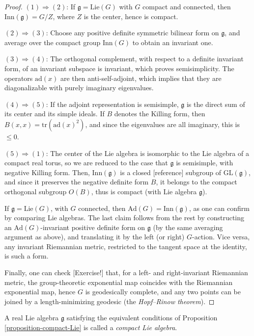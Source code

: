 \begin{proof}
 $(1) \Rightarrow (2)$: If $\mathfrak g = \text{Lie}(G)$ with $G$ compact and connected, then $\text{Inn}(\mathfrak g) = G/Z$, where $Z$ is the center, hence is compact. 
 
 $(2) \Rightarrow (3)$: Choose any positive definite symmetric bilinear form on $\mathfrak g$, and average over the compact group $\text{Inn}(G)$ to obtain an invariant one.
 
 $(3) \Rightarrow (4)$: The orthogonal complement, with respect to a definite invariant form, of an invariant subspace is invariant, which proves semisimplicity. The operators $\text{ad}(x)$ are then anti-self-adjoint, which implies that they are diagonalizable with purely imaginary eigenvalues.
 
 $(4) \Rightarrow (5)$: If the adjoint representation is semisimple, $\mathfrak g$ is the direct sum of its center and its simple ideals. If $B$ denotes the Killing form, then $B(x,x) = \text{tr}(\text{ad}(x)^2)$, and since the eigenvalues are all imaginary, this is $\le 0$. 
 
 $(5) \Rightarrow (1)$: The center of the Lie algebra is isomorphic to the Lie algebra of a compact real torus, so we are reduced to the case that $\mathfrak g$ is semisimple, with negative Killing form. Then, $\text{Inn}(\mathfrak g)$ is a closed [reference] subgroup of $\text{GL}(\mathfrak g)$, and since it preserves the negative definite form $B$, it belongs to the compact orthogonal subgroup $O(B)$, thus is compact (with Lie algebra $\mathfrak g$). 
 
 If $\mathfrak g = \text{Lie}(G)$, with $G$ connected, then $\text{Ad}(G)=\text{Inn}(\mathfrak g)$, as one can confirm by comparing Lie algebras. The last claim follows from the rest by constructing an $\text{Ad}(G)$-invariant positive definite form on $\mathfrak g$ (by the same averaging argument as above), and translating it by the left (or right) $G$-action. Vice versa, any invariant Riemannian metric, restricted to the tangent space at the identity, is such a form.
 
 Finally, one can check [Exercise!] that, for a left- and right-invariant Riemannian metric, the group-theoretic exponential map coincides with the Riemannian exponential map, hence $G$ is geodesically complete, and any two points can be joined by a length-minimizing geodesic (the \emph{Hopf--Rinow theorem}). 
\end{proof}

\begin{definition}
 \label{definition-compact-Lie}
A real Lie algebra $\mathfrak g$ satisfying the equivalent conditions of Proposition \ref{proposition-compact-Lie} is called a {\it compact Lie algebra}. 
\end{definition}

